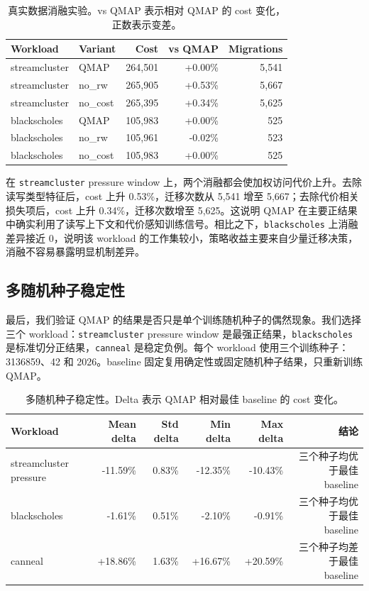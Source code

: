 \begin{table}[t]
  \centering
  \caption{真实数据消融实验。vs QMAP 表示相对 QMAP 的 cost 变化，正数表示变差。}
  \label{tab:real-ablation}
  \scriptsize
  \begin{tabular}{llrrr}
    \toprule
    Workload & Variant & Cost & vs QMAP & Migrations \\
    \midrule
    streamcluster & QMAP & 264,501 & +0.00\% & 5,541 \\
    streamcluster & no\_rw & 265,905 & +0.53\% & 5,667 \\
    streamcluster & no\_cost & 265,395 & +0.34\% & 5,625 \\
    \midrule
    blackscholes & QMAP & 105,983 & +0.00\% & 525 \\
    blackscholes & no\_rw & 105,961 & -0.02\% & 523 \\
    blackscholes & no\_cost & 105,983 & +0.00\% & 525 \\
    \bottomrule
  \end{tabular}
\end{table}

在 \texttt{streamcluster} pressure window 上，两个消融都会使加权访问代价上升。去除读写类型特征后，cost 上升 0.53\%，迁移次数从 5,541 增至 5,667；去除代价相关损失项后，cost 上升 0.34\%，迁移次数增至 5,625。这说明 QMAP 在主要正结果中确实利用了读写上下文和代价感知训练信号。相比之下，\texttt{blackscholes} 上消融差异接近 0，说明该 workload 的工作集较小，策略收益主要来自少量迁移决策，消融不容易暴露明显机制差异。

\subsection{多随机种子稳定性}

最后，我们验证 QMAP 的结果是否只是单个训练随机种子的偶然现象。我们选择三个 workload：\texttt{streamcluster} pressure window 是最强正结果，\texttt{blackscholes} 是标准切分正结果，\texttt{canneal} 是稳定负例。每个 workload 使用三个训练种子：3136859、42 和 2026。baseline 固定复用确定性或固定随机种子结果，只重新训练 QMAP。

\begin{table}[t]
  \centering
  \caption{多随机种子稳定性。Delta 表示 QMAP 相对最佳 baseline 的 cost 变化。}
  \label{tab:seed-stability}
  \scriptsize
  \begin{tabular}{lrrrrr}
    \toprule
    Workload & Mean delta & Std delta & Min delta & Max delta & 结论 \\
    \midrule
    streamcluster pressure & -11.59\% & 0.83\% & -12.35\% & -10.43\% & 三个种子均优于最佳 baseline \\
    blackscholes & -1.61\% & 0.51\% & -2.10\% & -0.91\% & 三个种子均优于最佳 baseline \\
    canneal & +18.86\% & 1.63\% & +16.67\% & +20.59\% & 三个种子均差于最佳 baseline \\
    \bottomrule
  \end{tabular}
\end{table}

